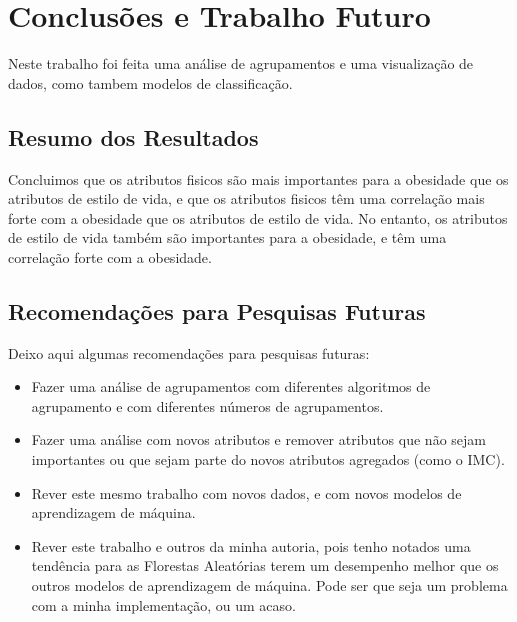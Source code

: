 \documentclass{easychair}
\begin{document}
\section{Conclusões e Trabalho Futuro}

Neste trabalho foi feita uma análise de agrupamentos e uma visualização de dados, como tambem modelos de classificação.

\subsection{Resumo dos Resultados}

Concluimos que os atributos fisicos são mais importantes para a obesidade que os atributos de estilo de vida, e que os atributos fisicos têm uma correlação mais forte com a obesidade que os atributos de estilo de vida. No entanto, os atributos de estilo de vida também são importantes para a obesidade, e têm uma correlação forte com a obesidade.

\subsection{Recomendações para Pesquisas Futuras}

Deixo aqui algumas recomendações para pesquisas futuras:

\begin{itemize}
  \item Fazer uma análise de agrupamentos com diferentes algoritmos de agrupamento e com diferentes números de agrupamentos.
  \item Fazer uma análise com novos atributos e remover atributos que não sejam importantes ou que sejam parte do novos atributos agregados (como o IMC).
  \item Rever este mesmo trabalho com novos dados, e com novos modelos de aprendizagem de máquina.
  \item Rever este trabalho e outros da minha autoria, pois tenho notados uma tendência para as Florestas Aleatórias terem um desempenho melhor que os outros modelos de aprendizagem de máquina. Pode ser que seja um problema com a minha implementação, ou um acaso.
\end{itemize}



\end{document}
